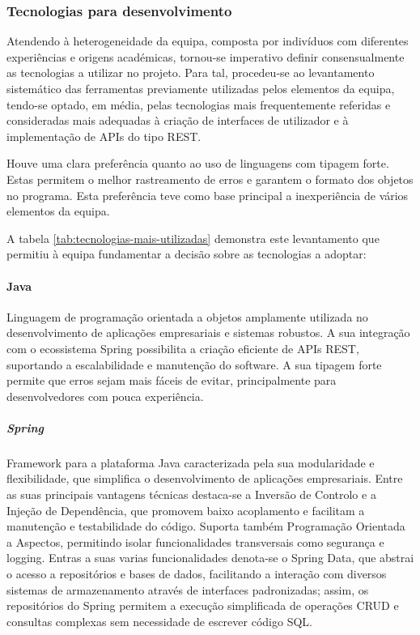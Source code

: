 \subsubsection{Tecnologias para desenvolvimento}

Atendendo à heterogeneidade da equipa, composta por indivíduos com diferentes experiências e origens académicas, tornou-se imperativo definir consensualmente as tecnologias a utilizar no projeto. Para tal, procedeu-se ao levantamento sistemático das ferramentas previamente utilizadas pelos elementos da equipa, tendo-se optado, em média, pelas tecnologias mais frequentemente referidas e consideradas mais adequadas à criação de interfaces de utilizador e à implementação de APIs do tipo REST.



Houve uma clara preferência quanto ao uso de linguagens com tipagem forte. Estas permitem o melhor rastreamento de erros e garantem o formato dos objetos no programa. Esta preferência teve como base principal a inexperiência de vários elementos da equipa.

A tabela \ref{tab:tecnologias-mais-utilizadas} demonstra este levantamento que permitiu à equipa fundamentar a decisão sobre as tecnologias a adoptar:

\paragraph{Java} Linguagem de programação orientada a objetos amplamente utilizada no desenvolvimento de aplicações empresariais e sistemas robustos. A sua integração com o ecossistema Spring possibilita a criação eficiente de APIs REST, suportando a escalabilidade e manutenção do software. A sua tipagem forte permite que erros sejam mais fáceis de evitar, principalmente para desenvolvedores com pouca experiência.  

\subparagraph{Spring} Framework para a plataforma Java caracterizada pela sua modularidade e flexibilidade, que simplifica o desenvolvimento de aplicações empresariais. Entre as suas principais vantagens técnicas destaca-se a Inversão de Controlo e a Injeção de Dependência, que promovem baixo acoplamento e facilitam a manutenção e testabilidade do código. Suporta também Programação Orientada a Aspectos, permitindo isolar funcionalidades transversais como segurança e logging. Entras a suas varias funcionalidades denota-se o Spring Data, que abstrai o acesso a repositórios e bases de dados, facilitando a interação com diversos sistemas de armazenamento através de interfaces padronizadas; assim, os repositórios do Spring permitem a execução simplificada de operações CRUD e consultas complexas sem necessidade de escrever código SQL.

